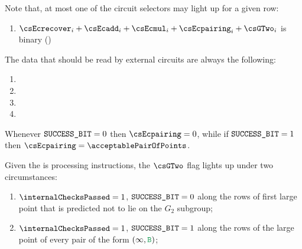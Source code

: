 Note that, at most one of the circuit selectors may light up for a given row:
\begin{enumerate}
    \item $\csEcrecover_{i} + \csEcadd_{i} + \csEcmul_{i} + \csEcpairing_{i} + \csGTwo_{i}$ is binary \quad (\trash)
\end{enumerate}
The data that should be read by external circuits are always the following:
\begin{enumerate}
    \item \ecdataId{}
    \item \ecdataIndex{}
    \item \ecdataLimb{}
    \item \ecdataSuccessBit{}
\end{enumerate}

\saNote{}
Whenever $\texttt{SUCCESS\_BIT} = 0$ then $\csEcpairing = 0$, while if $\texttt{SUCCESS\_BIT} = 1$ then $\csEcpairing = \acceptablePairOfPoints$.

\saNote{}
Given the \ecDataMod{} is processing \instEcpairing{} instructions, the $\csGTwo$ flag lights up under two circumstances:
\begin{enumerate} 
    \item $\internalChecksPassed = 1$, $\texttt{SUCCESS\_BIT} = 0$ along the rows of first large point that is predicted not to lie on the $G_2$ subgroup;
    \item $\internalChecksPassed = 1$, $\texttt{SUCCESS\_BIT} = 1$ along the rows of the large point of every pair of the form $(\infty, \locB)$;
\end{enumerate}



